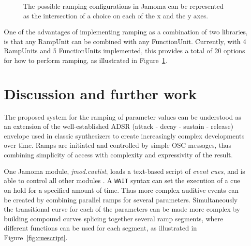 \documentclass{article}
\begin{document}
\begin{figure}
\centerline{}
\caption{The possible ramping configurations in Jamoma can be represented as the intersection of a choice on each of the x and the y axes.}
\label{fig:combinations}
\end{figure}

One of the advantages of implementing ramping as a combination of two libraries, is that any RampUnit can be combined with any FunctionUnit. Currently, with 4 RampUnits and 5 FunctionUnits implemented, this provides a total of 20 options for how to perform ramping, as illustrated in Figure~\ref{fig:combinations}.



\section{Discussion and further work} %
\label{sec:discussion_and_further_work}

The proposed system for the ramping of parameter values can be understood as an extension of the well-established ADSR (attack - decay - sustain - release) envelope used in classic synthesizers to create increasingly complex developments over time. Ramps are initiated and controlled by simple OSC messages, thus combining simplicity of access with complexity and expressivity of the result.

One Jamoma module, \emph{jmod.cuelist}, loads a text-based script of \emph{event cues}, and is able to control all other modules \cite{Place:2006}. A \texttt{WAIT} syntax can set the execution of a cue on hold for a specified amount of time. Thus more complex auditive events can be created by combining parallel ramps for several parameters. Simultaneously the transitional curve for each of the parameters can be made more complex by building compound curves splicing together several ramp segments, where different functions can be used for each segment, as illustrated in Figure~\ref{fig:cuescript}.
\end{document}
